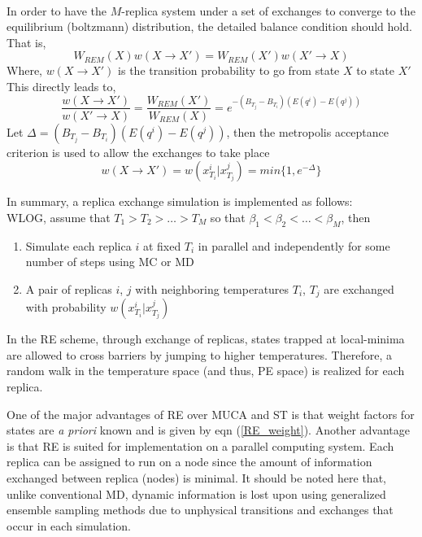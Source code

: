 \documentclass[12pt]{article}
\numberwithin{equation}{subsection}
\begin{document}
\begin{spacing}{1}
\begin{eqnarray}
\end{eqnarray}
In order to have the $M$-replica system under a set of exchanges to converge to the equilibrium (boltzmann) distribution, the detailed balance condition should hold. That is,
\begin{equation}
W_{REM}(X)w(X\rightarrow X') = W_{REM}(X')w(X'\rightarrow X)
\end{equation}
Where, $w(X\rightarrow X')$ is the transition probability to go from state $X$ to state $X'$  This directly leads to, 
\begin{equation}
\frac{w(X\rightarrow X')}{w(X'\rightarrow X)} = \frac{W_{REM}(X')}{W_{REM}(X)} = e^{-(B_{T_j}-B_{T_i})(E(q^i)-E(q^j))}
\end{equation}
Let $\Delta = (B_{T_j}-B_{T_i})(E(q^i)-E(q^j))$, then the metropolis acceptance criterion is used to allow the exchanges to take place 
\begin{equation}
	w(X\rightarrow X') = w(x_{T_i}^i | x_{T_j}^j) = min\{1, e^{-\Delta}\}
\end{equation}

In summary, a replica exchange simulation is implemented as follows: \\
WLOG, assume that $T_1 > T_2 > \ldots > T_M$ so that $\beta_1 < \beta_2 <  \ldots < \beta_M$, then
\begin{enumerate}
\item Simulate each replica $i$ at fixed $T_i$ in parallel and independently for some number of steps using MC or MD
\item A pair of replicas $i$, $j$ with neighboring temperatures $T_i$, $T_j$ are exchanged with probability $w(x_{T_i}^i | x_{T_j}^j)$
\end{enumerate}


In the RE scheme, through exchange of replicas, states trapped at local-minima are allowed to cross barriers by jumping to higher temperatures. Therefore, a random walk in the temperature space (and thus, PE space) is realized for each replica.

One of the major advantages of RE over MUCA and ST is that weight factors for states are \textit{a priori} known and is given by eqn (\ref{RE_weight}).
Another advantage is that RE is suited for implementation on a parallel computing system. Each replica can be assigned to run on a node since the amount of information exchanged between replica (nodes) is minimal. It should be noted here that, unlike conventional MD,  dynamic information is lost upon using generalized ensemble sampling methods due to unphysical transitions and exchanges that occur in each simulation.


\end{spacing}
\end{document}
